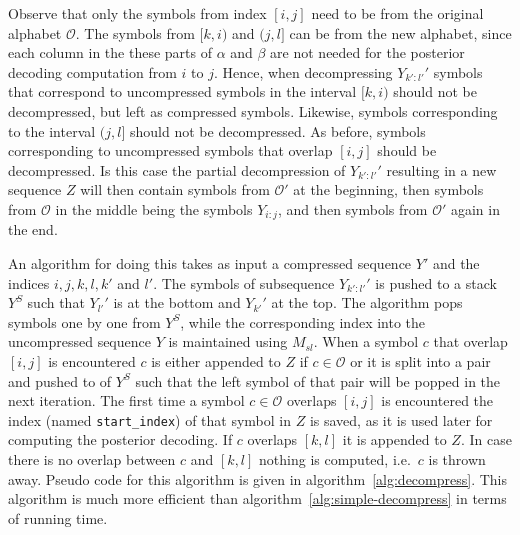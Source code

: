 Observe that only the symbols from index $[i,j]$ need to be from the original
alphabet $\mathcal{O}$. The symbols from $[k, i)$ and $(j, l]$ can be from the
new alphabet, since each column in the these parts of $\alpha$ and $\beta$ are
not needed for the posterior decoding computation from $i$ to $j$. Hence, when decompressing
$Y_{k':l'}'$ symbols that correspond to uncompressed symbols in the interval
$[k, i)$ should not be decompressed, but left as compressed symbols. Likewise,
symbols corresponding to the interval $(j, l]$ should not be decompressed. As
before, symbols corresponding to uncompressed symbols that overlap $[i, j]$
should be decompressed. Is this case the partial decompression of
$Y_{k':l'}'$ resulting in a new sequence $Z$ will then contain symbols
from $\mathcal{O'}$ at the beginning, then symbols from $\mathcal{O}$ in
the middle being the symbols $Y_{i:j}$, and then  symbols from
$\mathcal{O'}$ again in the end.

An algorithm for doing this takes as input a compressed sequence $Y'$ and the
indices $i, j, k, l, k'$ and $l'$. The symbols of subsequence $Y_{k':l'}'$ is
pushed to a stack $Y^S$ such that $Y_{l'}'$ is at the bottom and $Y_{k'}'$ at
the top. The algorithm pops symbols one by one from $Y^S$, while the
corresponding index into the uncompressed sequence $Y$ is maintained using
$M_{sl}$. When a symbol $c$ that overlap $[i, j]$ is encountered $c$ is either
appended to $Z$ if $c \in \mathcal{O}$ or it is split into a pair and pushed to
of $Y^S$ such that the left symbol of that pair will be popped in the next
iteration. The first time a symbol $c \in \mathcal{O}$ overlaps $[i, j]$ is
encountered the index (named \texttt{start\_index}) of that symbol in $Z$ is
saved, as it is used later for computing the posterior decoding. If $c$
overlaps $[k, l]$ it is appended to $Z$. In case there is no overlap between
$c$ and $[k, l]$ nothing is computed, i.e.\ $c$ is thrown away. Pseudo code for
this algorithm is given in algorithm~\ref{alg:decompress}. This algorithm is
much more efficient than algorithm~\ref{alg:simple-decompress} in terms of running
time.


